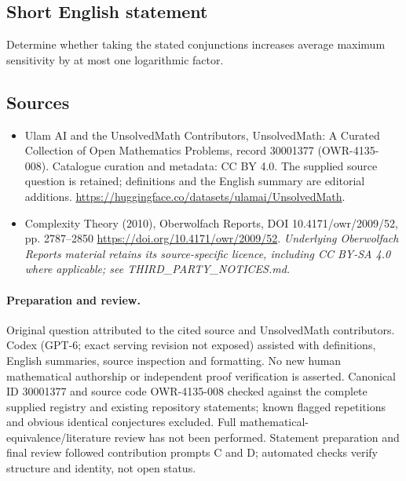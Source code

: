 \documentclass[11pt]{article}
\begin{document}
\subsection{Short English statement}
Determine whether taking the stated conjunctions increases average maximum sensitivity by at most one logarithmic factor.
\subsection{Sources}
\begin{itemize}
\item[\hypertarget{source:30001377:1}{S1}] Ulam AI and the UnsolvedMath Contributors, UnsolvedMath: A Curated Collection of Open Mathematics Problems, record 30001377 (OWR-4135-008). Catalogue curation and metadata: CC BY 4.0. The supplied source question is retained; definitions and the English summary are editorial additions.
\url{https://huggingface.co/datasets/ulamai/UnsolvedMath}.
\item[\hypertarget{source:30001377:2}{S2}] Complexity Theory (2010), Oberwolfach Reports, DOI 10.4171/owr/2009/52, pp. 2787--2850
\url{https://doi.org/10.4171/owr/2009/52}.
\textit{Underlying Oberwolfach Reports material retains its source-specific licence, including CC BY-SA 4.0 where applicable; see THIRD\_PARTY\_NOTICES.md.}
\end{itemize}
\paragraph{Preparation and review.}
Original question attributed to the cited source and UnsolvedMath contributors. Codex (GPT-6; exact serving revision not exposed) assisted with definitions, English summaries, source inspection and formatting. No new human mathematical authorship or independent proof verification is asserted. Canonical ID 30001377 and source code OWR-4135-008 checked against the complete supplied registry and existing repository statements; known flagged repetitions and obvious identical conjectures excluded. Full mathematical-equivalence/literature review has not been performed. Statement preparation and final review followed contribution prompts C and D; automated checks verify structure and identity, not open status.
\label{end:30001377}
\end{document}
